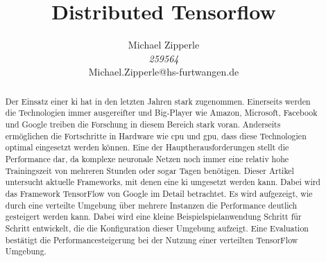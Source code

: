 \documentclass[journal]{IEEEtran}
\begin{document}
\title{Distributed Tensorflow}

\author{\begin{center}
 Michael Zipperle \\ 
 \textit{259564} \\
 Michael.Zipperle@hs-furtwangen.de \\
\end{center}}%
        

\maketitle


\begin{abstract}
Der Einsatz einer \ac{ki} hat in den letzten Jahren stark zugenommen. Einerseits werden die Technologien immer ausgereifter und Big-Player wie Amazon, Microsoft, Facebook und Google treiben die Forschung in diesem Bereich stark voran. Anderseits ermöglichen die Fortschritte in Hardware wie \acs{cpu} und \acs{gpu}, dass diese Technologien optimal eingesetzt werden können. Eine der Hauptherausforderungen stellt die Performance dar, da komplexe neuronale Netzen noch immer eine relativ hohe Trainingszeit von mehreren Stunden oder sogar Tagen benötigen. Dieser Artikel untersucht aktuelle Frameworks, mit denen eine \ac{ki} umgesetzt werden kann. Dabei wird das Framework TensorFlow von Google im Detail betrachtet. Es wird aufgezeigt, wie durch eine verteilte Umgebung über mehrere Instanzen die Performance deutlich gesteigert werden kann. Dabei wird eine kleine Beispielspielanwendung Schritt für Schritt entwickelt, die die Konfiguration dieser Umgebung aufzeigt. Eine Evaluation bestätigt die Performancesteigerung bei der Nutzung einer verteilten TensorFlow Umgebung. 

\end{abstract}
\IEEEpeerreviewmaketitle











\ifCLASSOPTIONcaptionsoff
  \newpage
\fi
\end{document}
